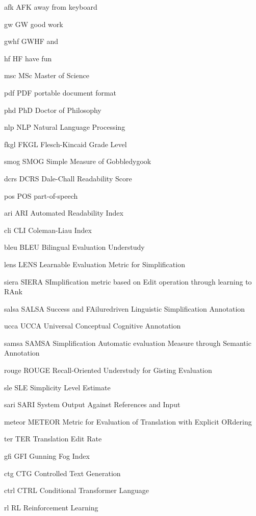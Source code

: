 \newabbreviation
{afk}
{AFK}
{away from keyboard}

\newabbreviation
{gw}
{GW}
{good work}

\newabbreviation
{gwhf}
{GWHF}
{ and }

\newabbreviation
{hf}
{HF}
{have fun}

\newabbreviation
{msc}
{MSc}
{Master of Science}

\newabbreviation
{pdf}
{PDF}
{portable document format}

\newabbreviation
{phd}
{PhD}
{Doctor of Philosophy}

\newabbreviation
{nlp}
{NLP}
{Natural Language Processing}

\newabbreviation
{fkgl}
{FKGL}
{Flesch-Kincaid Grade Level}

\newabbreviation
{smog}
{SMOG}
{Simple Measure of Gobbledygook}

\newabbreviation
{dcrs}
{DCRS}
{Dale-Chall Readability Score}

\newabbreviation
{pos}
{POS}
{part-of-speech}

\newabbreviation
{ari}
{ARI}
{Automated Readability Index}

\newabbreviation
{cli}
{CLI}
{Coleman-Liau Index}

\newabbreviation
{bleu}
{BLEU}
{Bilingual Evaluation Understudy}

\newabbreviation
{lens}
{LENS}
{Learnable Evaluation Metric for Simplification}

\newabbreviation
{siera}
{SIERA}
{SImplification metric based on Edit operation through learning to RAnk}

\newabbreviation
{salsa}
{SALSA}
{Success and FAiluredriven Linguistic Simplification Annotation}

\newabbreviation
{ucca}
{UCCA}
{Universal Conceptual Cognitive Annotation}

\newabbreviation
{samsa}
{SAMSA}
{Simplification Automatic evaluation Measure through Semantic Annotation}

\newabbreviation
{rouge}
{ROUGE}
{Recall-Oriented Understudy for Gisting Evaluation}

\newabbreviation
{sle}
{SLE}
{Simplicity Level Estimate}

\newabbreviation
{sari}
{SARI}
{System Output Against References and Input}

\newabbreviation
{meteor}
{METEOR}
{Metric for Evaluation of Translation with Explicit ORdering}

\newabbreviation
{ter}
{TER}
{Translation Edit Rate}

\newabbreviation
{gfi}
{GFI}
{Gunning Fog Index}

\newabbreviation
{ctg}
{CTG}
{Controlled Text Generation}

\newabbreviation
{ctrl}
{CTRL}
{Conditional Transformer Language}

\newabbreviation
{rl}
{RL}
{Reinforcement Learning}